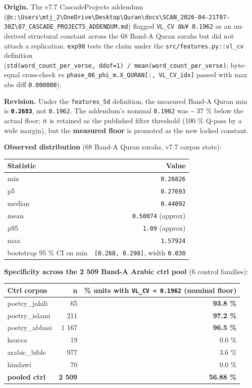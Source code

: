 \documentclass[
]{article}
\newcounter{none} %
\begin{document}
\textbf{Origin.} The v7.7 CascadeProjects addendum
(\texttt{@c:\textbackslash{}Users\textbackslash{}mtj\_2\textbackslash{}OneDrive\textbackslash{}Desktop\textbackslash{}Quran\textbackslash{}docs\textbackslash{}SCAN\_2026-04-21T07-30Z\textbackslash{}07\_CASCADE\_PROJECTS\_ADDENDUM.md})
flagged \texttt{VL\_CV\ â‰¥\ 0.1962} as an un-derived structural
constant across the 68 Band-A Quran surahs but did not attach a
replication. \texttt{exp98} tests the claim under the
\texttt{src/features.py::vl\_cv} definition
(\texttt{std(word\_count\_per\_verse,\ ddof=1)\ /\ mean(word\_count\_per\_verse)};
byte-equal cross-check vs
\texttt{phase\_06\_phi\_m.X\_QURAN{[}:,\ VL\_CV\_idx{]}} passed with max
abs diff \texttt{0.000000}).

\textbf{Revision.} Under the \texttt{features\_5d} definition, the
measured Band-A Quran min is \textbf{\texttt{0.2683}}, not
\texttt{0.1962}. The addendum's nominal \texttt{0.1962} was
\textasciitilde{} 37 \% below the actual floor; it is retained as the
published filter threshold (100 \% Q-pass by a wide margin), but the
\textbf{measured floor} is promoted as the new locked constant.

\textbf{Observed distribution} (68 Band-A Quran surahs, v7.7 corpus
state):

{\def\LTcaptype{none} %
\begin{longtable}[]{@{}lr@{}}
\toprule\noalign{}
Statistic & Value \\
\midrule\noalign{}
\endhead
\bottomrule\noalign{}
\endlastfoot
min & \texttt{0.26826} \\
p5 & \texttt{0.27693} \\
median & \texttt{0.44092} \\
mean & \texttt{0.50074} (approx) \\
p95 & \texttt{1.09} (approx) \\
max & \texttt{1.57924} \\
bootstrap 95 \% CI on min & \texttt{{[}0.268,\ 0.298{]}}, width
\texttt{0.030} \\
\end{longtable}
}

\textbf{Specificity across the 2 509 Band-A Arabic ctrl pool} (6 control
families):

{\def\LTcaptype{none} %
\begin{longtable}[]{@{}lrr@{}}
\toprule\noalign{}
Ctrl corpus & n & \% units with \texttt{VL\_CV\ \textless{}\ 0.1962}
(nominal floor) \\
\midrule\noalign{}
\endhead
\bottomrule\noalign{}
\endlastfoot
poetry\_jahili & 65 & \textbf{93.8 \%} \\
poetry\_islami & 211 & \textbf{97.2 \%} \\
poetry\_abbasi & 1 167 & \textbf{96.5 \%} \\
ksucca & 19 & 0.0 \% \\
arabic\_bible & 977 & 3.6 \% \\
hindawi & 70 & 0.0 \% \\
\textbf{pooled ctrl} & \textbf{2 509} & \textbf{56.88 \%} \\
\end{longtable}
}
\end{document}
